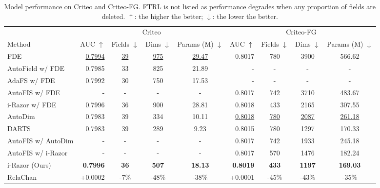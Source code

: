 \documentclass[10pt,journal,compsoc]{IEEEtran}
\begin{document}
\begin{table*}[thp!]
\caption{Model performance on Criteo and Criteo-FG. FTRL is not listed as performance degrades when any proportion of fields are deleted. $\uparrow$: the higher the better; $\downarrow$: the lower the better.}
\centering
\begin{tabular}{lrcccrccc}
\toprule[1pt]
 & \multicolumn{4}{c}{Criteo} & \multicolumn{4}{c}{Criteo-FG} \\ \cmidrule(r){2-5} \cmidrule(r){6-9} 
Method & AUC $\uparrow$ & Fields $\downarrow$ & Dims $\downarrow$ & Params (M) $\downarrow$ & AUC $\uparrow$ & Fields $\downarrow$ & Dims $\downarrow$ & Params (M) $\downarrow$ \\ \midrule
FDE & \ul{0.7994} & \ul{39} & \ul{975} & \ul{29.47} & 0.8017 & 780 & 3900 & 566.62 \\
  {AutoField w/ FDE} & 0.7985 & 33 & 825 & 21.89 & - & - & - & - \\
  {AdaFS w/ FDE} & 0.7992 & 30 & 750 & 17.53 & - & - & - & - \\
AutoFIS w/ FDE & - & - & - & - & 0.8017 & 742 & 3710 & 483.67 \\
i-Razor w/ FDE & 0.7996 & 36 & 900 & 28.81 & 0.8018 & 433 & 2165 & 307.55 \\ \midrule
AutoDim & 0.7983 & 39 & 334 & 10.11 & \ul{0.8018} & \ul{780} & \ul{2087} & \ul{261.18} \\
DARTS & 0.7983 & 39 & 289 & 9.23 & 0.8015 & 780 & 1297 & 170.33 \\ \midrule
AutoFIS w/ AutoDim & - & - & - & - & 0.8017 & 742 & 1933 & 245.18 \\
AutoFIS w/ i-Razor & - & - & - & - & 0.8017 & 570 & 1476 & 182.24 \\
i-Razor (Ours) & \textbf{0.7996} & \textbf{36} & \textbf{507} & \textbf{18.13} & \textbf{0.8019} & \textbf{433} & \textbf{1197} & \textbf{169.03} \\ \midrule
RelaChan & +0.0002 & -7\% & -48\% & -38\% & +0.0001 & -45\% & -43\% & -35\% \\ \bottomrule[1pt]
\end{tabular}
\label{result:criteo}
\end{table*}
\end{document}
